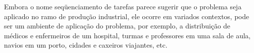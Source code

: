 Embora o nome seqüenciamento de tarefas parece sugerir que o problema seja aplicado no ramo de produção industrial, ele ocorre em variados contextos, pode ser um ambiente de aplicação do problema, por exemplo, a distribuição de médicos e enfermeiros de um hospital, turmas e professores em uma sala de aula, navios em um porto, cidades e caxeiros viajantes, etc. \cite{REIS} 










